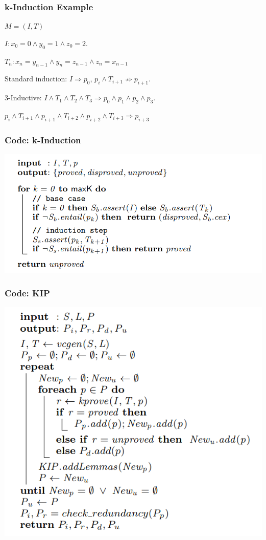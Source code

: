 \documentclass[11pt]{beamer}
\begin{document}
\begin{frame}\frametitle{k-Induction Example}
\begin{example}[2]
$M = (I,T)$

$I: x_0 = 0\wedge y_0 = 1\wedge z_0 = 2$.

$T_n: x_n = y_{n-1} \wedge y_n = z_{n-1} \wedge z_n = x_{n - 1}$
\end{example}

Standard induction: $I\Rightarrow p_0$, $p_i \wedge T_{i+1} \not\Rightarrow p_{i+1}$.

3-Inductive: $I \wedge T_1 \wedge T_2\wedge T_3 \Rightarrow p_0 \wedge p_1\wedge p_2\wedge p_3$.

$p_i\wedge T_{i+1} \wedge p_{i+1}\wedge T_{i+2} \wedge p_{i+2}\wedge T_{i+3} \Rightarrow p_{i+3}$
\end{frame}

\begin{frame}\frametitle{Code: k-Induction}
\begin{center}
\includegraphics[scale=0.4]{8.png}
\end{center}
\end{frame}

\begin{frame}\frametitle{Code: KIP}
\begin{center}
\includegraphics[scale=0.4]{9.png}
\end{center}
\end{frame}
\end{document}
